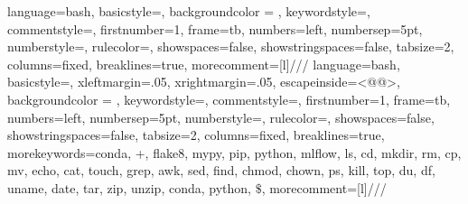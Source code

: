 		{
				language=bash,
				basicstyle=\footnotesize\ttfamily, %
				backgroundcolor = \color{mysticlight}, %
				keywordstyle=\color{vbablue},   %
				commentstyle=\color{vbagreen},  %
				firstnumber=1,                	%
				frame=tb,	                	%
				numbers=left,                   %
				numbersep=5pt,                  %
				numberstyle=\tiny\color{gray},	%
				rulecolor=\color{black},        %
				showspaces=false,               %
				showstringspaces=false,         %
				tabsize=2,		                %
				columns=fixed,					%
				breaklines=true,				%
				morecomment=[l]{///}				%
		}
		{
				language=bash,
				basicstyle=\color{white}\footnotesize\ttfamily, %
				xleftmargin=.05\textwidth,
				xrightmargin=.05\textwidth,
				escapeinside={<@}{@>},
				backgroundcolor = \color{vscodebackground}, %
				keywordstyle=\color{yellow},   %
				commentstyle=\color{vbagreen},  %
				firstnumber=1,                	%
				frame=tb,	                	%
				numbers=left,                   %
				numbersep=5pt,                  %
				numberstyle=\tiny\color{gray},	%
				rulecolor=\color{black},        %
				showspaces=false,               %
				showstringspaces=false,         %
				tabsize=2,		                %
				columns=fixed,					%
				breaklines=true,				%
				morekeywords={conda, +, flake8, mypy, pip, python, mlflow, ls, cd, mkdir, rm, cp, mv, echo, cat, touch, grep, awk, sed, find, chmod, chown, ps, kill, top, du, df, uname, date, tar, zip, unzip, conda, python, $\$$},		%
				morecomment=[l]{///}			%
		}
